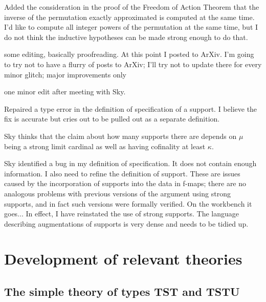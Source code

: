 \documentclass[112pt]{article}
\begin{document}
\begin{description}
\item[11/20/2023:]  Added the consideration in the proof of the Freedom of Action Theorem that the inverse of the permutation exactly approximated is computed at the same time.  I'd like to compute all integer powers of the permutation at the same time, but I do not think the inductive hypotheses can be made strong enough to do that.

\item[11/21/2023:]  some editing, basically proofreading.  At this point I posted to ArXiv.  I'm going to try not to have a flurry of posts to ArXiv;  I'll try not to update there for every minor glitch;  major improvements only

\item[11/21/2023:]  one minor edit after meeting with Sky.

\item[1/2/2024:]  Repaired a type error in the definition of specification of a support.  I believe the fix is accurate but cries out to be pulled out as a separate definition.

\item Sky thinks that the claim about how many supports there are depends on $\mu$ being a strong limit cardinal as well as having cofinality at least $\kappa$.

\item[2/8/2024:]  Sky identified a bug in my definition of specification.  It does not contain enough information.  I also need to refine the definition of support.  These are issues caused by the incorporation of supports into the data in f-maps;  there are no analogous problems with previous versions of the argument using strong supports,
and in fact such versions were formally verified.  On the workbench it goes...  In effect, I have reinstated the use of strong supports.  The language describing augmentations of supports is very dense and needs to be tidied up.

\end{description}


\section{Development of relevant theories}

\subsection{The simple theory of types TST and TSTU}
\end{document}
